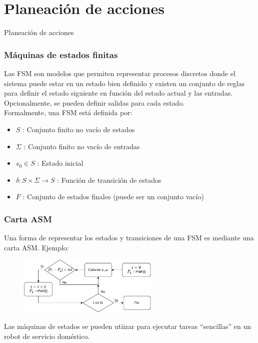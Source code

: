 \section{Planeación de acciones}

\begin{frame}
  \Huge
  Planeación de acciones
\end{frame}

\begin{frame}\frametitle{Máquinas de estados finitas}
  Las FSM son modelos que permiten representar procesos discretos donde el sistema puede estar en un estado bien definido y existen un conjunto de reglas para definir el estado siguiente en función del estado actual y las entradas. Opcionalmente, se pueden definir salidas para cada estado. \\
  Formalmente, una FSM está definida por:
  \begin{itemize}
  \item $S$ : Conjunto finito no vacío de estados
  \item $\Sigma$ : Conjunto finito no vacío de entradas
  \item $s_0 \in S$ : Estado inicial
  \item $\delta : S\times\Sigma\rightarrow S$ : Función de transición de estados
  \item $F$ : Conjunto de estados finales (puede ser un conjunto vacío)
  \end{itemize}
\end{frame}

\begin{frame}\frametitle{Carta ASM}
  Una forma de representar los estados y transiciones de una FSM es mediante una carta ASM. Ejemplo:
  \begin{figure}
    \centering
    \includegraphics[width=0.6\textwidth]{Figures/PathFollowing.pdf}
  \end{figure}
  Las máquinas de estados se pueden utiizar para ejecutar tareas ``sencillas'' en un robot de servicio doméstico. 
\end{frame}


